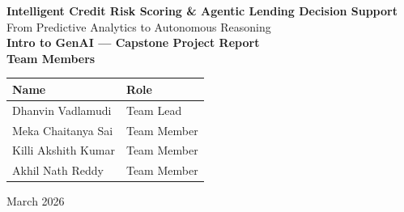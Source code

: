 \documentclass[12pt, a4paper]{article}
\begin{document}
\begin{titlepage}
  \centering
  \vspace*{2cm}

  {\LARGE\bfseries Intelligent Credit Risk Scoring \& Agentic Lending Decision Support}\\[0.5cm]
  {\Large From Predictive Analytics to Autonomous Reasoning}\\[2cm]

  {\large\textbf{Intro to GenAI --- Capstone Project Report}}\\[2.5cm]

  {\large\textbf{Team Members}}\\[0.5cm]
  \begin{tabular}{l l}
    \toprule
    \textbf{Name} & \textbf{Role} \\
    \midrule
    Dhanvin Vadlamudi   & Team Lead \\
    Meka Chaitanya Sai  & Team Member \\
    Killi Akshith Kumar & Team Member \\
    Akhil Nath Reddy    & Team Member \\
    \bottomrule
  \end{tabular}

  \vfill

  {\large March 2026}

\end{titlepage}

\newpage
\begin{abstract}
Loan defaults represent a catastrophic risk for financial institutions, necessitating rigorous predictive and qualitative evaluation frameworks. In this project, we present an end-to-end framework that evolves from classical machine learning (Milestone 1) to an autonomous Agentic AI system (Milestone 2). By training an XGBoost ensemble on a dataset of 45,000 loan records, we achieved a benchmarking accuracy of 91.27\% and an ROC-AUC of 0.98. We further enhanced this model by orchestrating a LangGraph-driven reasoning agent integrated with a FAISS-based Retrieval-Augmented Generation (RAG) pipeline. This system synthesizes predictive scores with real-time retrievals from RBI and Basel III regulatory corpora, providing grounded and explainable lending assessments. Our work demonstrates that the synergy between predictive ML and agentic LLMs can significantly reduce default exposure while maintaining ethical compliance.
\end{abstract}
\end{document}
